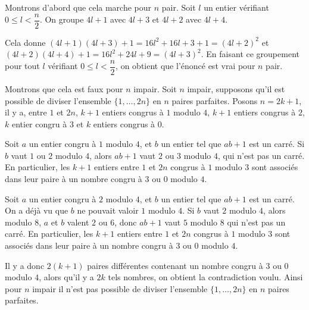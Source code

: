 Montrons d'abord que cela marche pour $n$ pair. Soit $l$ un entier vérifiant $0 \le l <\dfrac{n}{2}$. On groupe $4l + 1$ avec $4l + 3$ et $4l + 2$ avec $4l + 4$.

Cela donne $(4l + 1)(4l + 3) + 1 = 16l^2 + 16l + 3 + 1 = (4l + 2)^2$ et $(4l + 2)(4l + 4) + 1 = 16l^2 + 24l + 9 = (4l + 3)^2$. En faisant ce groupement pour tout $l$ vérifiant $0 \le l < \dfrac{n}{2}$, on obtient que l'énoncé est vrai pour $n$ pair.
\medskip

Montrons que cela est faux pour $n$ impair. Soit $n$ impair, supposons qu'il est possible de diviser l'ensemble $\{1, \dots, 2n\}$ en $n$ paires parfaites. Posons $n = 2k + 1$, il y a, entre $1$ et $2n$, $k+1$ entiers congrus à $1$ modulo $4$, $k + 1$ entiers congrus à $2$, $k$ entier congru à $3$ et $k$ entiers congrus à $0$.

Soit $a$ un entier congru à $1$ modulo $4$, et $b$ un entier tel que $ab + 1$ est un carré. Si $b$ vaut $1$ ou $2$ modulo $4$, alors $ab+1$ vaut $2$ ou $3$ modulo $4$, qui n'est pas un carré. En particulier, les $k + 1$ entiers entre $1$ et $2n$ congrus à $1$ modulo $3$ sont associés dans leur paire à un nombre congru à $3$ ou $0$ modulo $4$.

Soit $a$ un entier congru à $2$ modulo $4$, et $b$ un entier tel que $ab + 1$ est un carré. On a déjà vu que $b$ ne pouvait valoir $1$ modulo $4$. Si $b$ vaut $2$ modulo $4$, alors modulo $8$, $a$ et $b$ valent $2$ ou $6$, donc $ab + 1$ vaut $5$ modulo $8$ qui n'est pas un carré. En particulier, les $k+1$ entiers entre $1$ et $2n$ congrus à $1$ modulo $3$ sont associés dans leur paire à un nombre congru à $3$ ou $0$ modulo $4$.

Il y a donc $2(k + 1)$ paires différentes contenant un nombre congru à $3$ ou $0$ modulo $4$, alors qu'il y a $2k$ tels nombres, on obtient la contradiction voulu. Ainsi pour $n$ impair il n'est pas possible de diviser l'ensemble $\{1, \dots, 2n\}$ en $n$ paires parfaites.